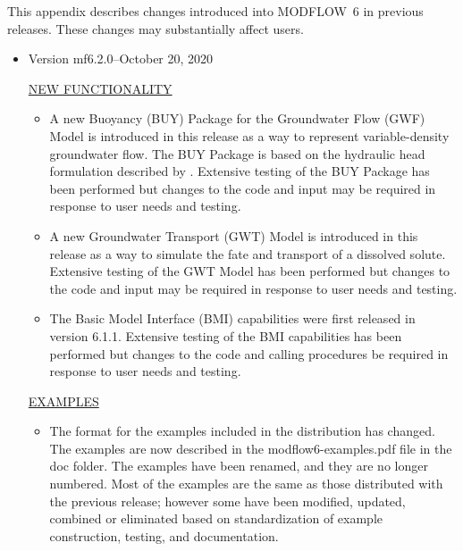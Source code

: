 This appendix describes changes introduced into MODFLOW~6 in previous releases. These changes may substantially affect users.

\begin{itemize}

	\item Version mf6.2.0--October 20, 2020
	
	\underline{NEW FUNCTIONALITY}
	\begin{itemize}
	        \item A new Buoyancy (BUY) Package for the Groundwater Flow (GWF) Model is introduced in this release as a way to represent variable-density groundwater flow.  The BUY Package is based on the hydraulic head formulation described by \cite{langevin2020hydraulic}.  Extensive testing of the BUY Package has been performed but changes to the code and input may be required in response to user needs and testing.   
		\item A new Groundwater Transport (GWT) Model is introduced in this release as a way to simulate the fate and transport of a dissolved solute.  Extensive testing of the GWT Model has been performed but changes to the code and input may be required in response to user needs and testing. 
		\item The Basic Model Interface (BMI) capabilities were first released in version 6.1.1.  Extensive testing of the BMI capabilities has been performed but changes to the code and calling procedures be required in response to user needs and testing.
	\end{itemize}
	
	\underline{EXAMPLES}
	\begin{itemize}
	\item The format for the examples included in the distribution has changed.  The examples are now described in the modflow6-examples.pdf file in the doc folder.  The examples have been renamed, and they are no longer numbered.  Most of the examples are the same as those distributed with the previous release; however some have been modified, updated, combined or eliminated based on standardization of example construction, testing, and documentation.  
	\end{itemize}


\end{itemize}
